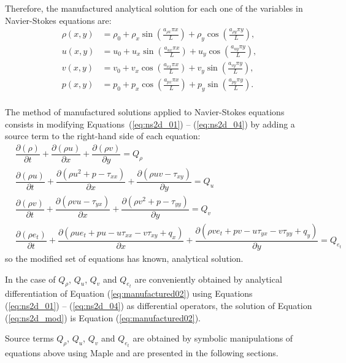 \documentclass[10pt]{article}
\newcommand{\Diff}[2] {\dfrac{\partial( #1)}{\partial #2}}
\begin{document}
\begin{landscape}
Therefore, the manufactured analytical solution for each one of the variables in Navier-Stokes equations are:
\begin{equation}
\begin{split}
\label{eq:manufactured02}
\rho\left(x,y\right) &=  \rho_{0}+ \rho_{x} \sin\left(\frac{a_{ \rho x} \pi x}{L}\right)+ \rho_{y} \cos\left(\frac{a_{ \rho y} \pi y}{L}\right),\\
u\left(x,y\right) &= u_{0}+u_{x} \sin\left(\frac{a_{u x} \pi x}{L}\right)+u_{y} \cos\left(\frac{a_{u y} \pi y}{L}\right),\\
v\left(x,y\right) &= v_{0}+v_{x} \cos\left(\frac{a_{v x} \pi x}{L}\right)+v_{y} \sin\left(\frac{a_{v y} \pi y}{L}\right),\\
p\left(x,y\right) &= p_{0}+p_{x} \cos\left(\frac{a_{p x} \pi x}{L}\right)+p_{y} \sin\left(\frac{a_{p y} \pi y}{L}\right).\\
\end{split}
\end{equation}



The method of manufactured solutions applied to Navier-Stokes equations consists in modifying Equations~(\ref{eq:ns2d_01}) -- (\ref{eq:ns2d_04}) by adding a source term to the right-hand side of each equation:
\begin{equation}
\begin{split}
\label{eq:ns2d_mod}
& \Diff{\rho}{t} + \Diff{\rho u}{x}+\Diff{\rho v}{y} = Q_\rho\\
& \Diff{\rho u}{t} + \Diff{\rho u^2 + p - \tau_{xx}}{x}+\Diff{\rho uv-\tau_{xy}}{y} = Q_u\\
& \Diff{\rho v}{t} + \Diff{\rho vu - \tau_{yx}}{x}+\Diff{\rho v^2+p-\tau_{yy}}{y} = Q_v\\
& \Diff{\rho e_t}{t} + \Diff{\rho ue_t +pu -u \tau_{xx}- v\tau_{xy} +q_x}{x}+\Diff{\rho ve_t +pv- u \tau_{yx} -v \tau_{yy} + q_y}{y} = Q_{e_t}
\end{split}
\end{equation}
so the modified set of equations has known, analytical solution.

In the case of $Q_\rho$, $Q_u$, $Q_v$ and $Q_{e_t}$ are conveniently obtained by analytical differentiation of Equation ({\ref{eq:manufactured02}}) using Equations~ (\ref{eq:ns2d_01}) -- (\ref{eq:ns2d_04}) as differential operators, the solution of Equation (\ref{eq:ns2d_mod}) is  Equation (\ref{eq:manufactured02}).

Source terms $Q_\rho$, $Q_u$, $Q_v$ and $Q_{e_t}$ are obtained by symbolic manipulations of equations above using Maple and are presented in the following sections.


\end{landscape}
\end{document}
